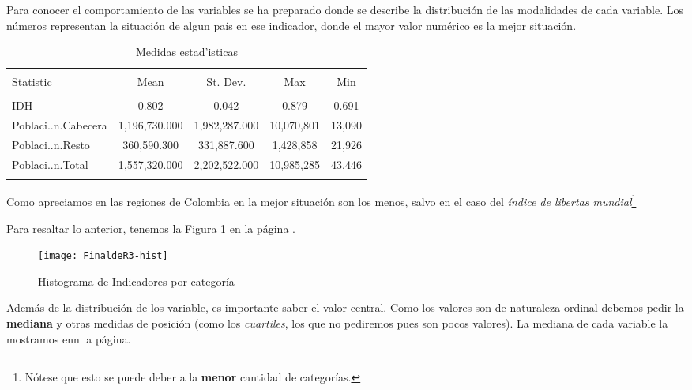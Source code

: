 \documentclass{article}
\begin{document}
Para conocer el comportamiento de las variables se ha preparado  donde se describe la distribuci\'on de las modalidades de cada variable. Los n\'umeros representan la situaci\'on de algun pa\'is en ese indicador, donde el mayor valor num\'erico es la mejor situaci\'on.



\begin{table}[!htbp] \centering 
  \caption{Medidas estad'isticas} 
  \label{stats} 
\begin{tabular}{@{\extracolsep{5pt}}lcccc} 
\\[-1.8ex]\hline 
\hline \\[-1.8ex] 
Statistic & \multicolumn{1}{c}{Mean} & \multicolumn{1}{c}{St. Dev.} & \multicolumn{1}{c}{Max} & \multicolumn{1}{c}{Min} \\ 
\hline \\[-1.8ex] 
IDH & 0.802 & 0.042 & 0.879 & 0.691 \\ 
Poblaci..n.Cabecera & 1,196,730.000 & 1,982,287.000 & 10,070,801 & 13,090 \\ 
Poblaci..n.Resto & 360,590.300 & 331,887.600 & 1,428,858 & 21,926 \\ 
Poblaci..n.Total & 1,557,320.000 & 2,202,522.000 & 10,985,285 & 43,446 \\ 
\hline \\[-1.8ex] 
\end{tabular} 
\end{table} 
Como apreciamos en  las regiones de Colombia en la mejor situaci\'on son los menos, salvo en el caso del \emph{\'indice de libertas mundial}\footnote{N\'otese que esto se puede deber a la {\bf menor} cantidad de categor\'ias.}

\clearpage

Para resaltar lo anterior, tenemos la Figura \ref{barplots} en la p\'agina \pageref{barplots}. 


\begin{figure}[h]
\centering

\texttt{[image: FinaldeR3-hist]}



\caption{Histograma de Indicadores por categor\'ia}
\label{barplots}
\end{figure}

Adem\'as de la distribuci\'on de los variable, es importante saber el valor central. Como los valores son de naturaleza ordinal debemos pedir la {\bf mediana} y otras medidas de posici\'on (como los \emph{cuartiles}, los que no pediremos pues son pocos valores). La mediana de cada variable la mostramos enn la p\'agina.
\end{document}
